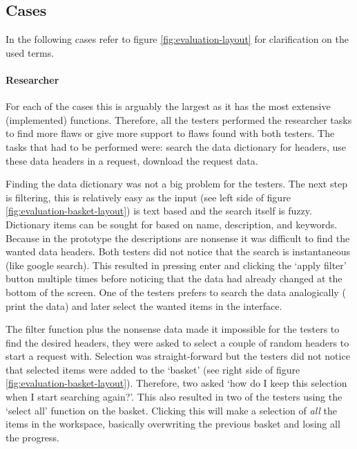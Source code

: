 \subsection{Cases}
\label{evaluation-cases}

In the following cases refer to figure \ref{fig:evaluation-layout} for clarification on the used terms.

\paragraph{Researcher}
For each of the cases this is arguably the largest as it has the most extensive (implemented) functions.
Therefore, all the testers performed the researcher tasks to find more flaws or give more support to flaws found with both testers.
The tasks that had to be performed were: search the data dictionary for headers, use these data headers in a request, download the request data.


Finding the data dictionary was not a big problem for the testers.
The next step is filtering, this is relatively easy as the input (see left side of figure \ref{fig:evaluation-basket-layout}) is text based and the search itself is fuzzy.
Dictionary items can be sought for based on name, description, and keywords.
Because in the prototype the descriptions are nonsense it was difficult to find the wanted data headers.
Both testers did not notice that the search is instantaneous (like google search).
This resulted in pressing enter and clicking the `apply filter' button multiple times before noticing that the data had already changed at the bottom of the screen.
One of the testers prefers to search the data analogically (\ie{} print the data) and later select the wanted items in the interface.

The filter function plus the nonsense data made it impossible for the testers to find the desired headers, they were asked to select a couple of random headers to start a request with.
Selection was straight-forward but the testers did not notice that selected items were added to the `basket' (see right side of figure \ref{fig:evaluation-basket-layout}).
Therefore, two asked `how do I keep this selection when I start searching again?'.
This also resulted in two of the testers using the `select all' function on the basket. 
Clicking this will make a selection of \emph{all} the items in the workspace, basically overwriting the previous basket and losing all the progress.


